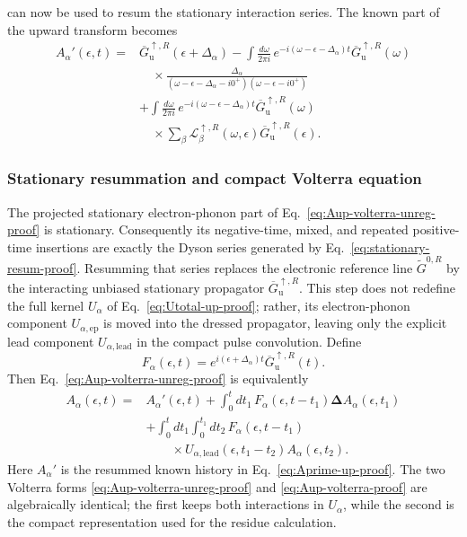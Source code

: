\documentclass[
 reprint,
 superscriptaddress,
 amsmath,amssymb,
 aps,prb,
 longbibliography,
 floatfix
]{revtex4-2}
\newcommand{\ep}{\mathrm{ep}}
\newcommand{\lead}{\mathrm{lead}}
\begin{document}
can now be used to resum the stationary interaction series. The known part of the upward transform becomes
\begin{equation}
\begin{aligned}
A_\alpha'(\epsilon,t)
={}&
\overline G_{\mathrm u}^{\uparrow,R}(\epsilon+\Delta_\alpha)
-
\int\frac{d\omega}{2\pi i}\,
e^{-i(\omega-\epsilon-\Delta_\alpha)t}
\overline G_{\mathrm u}^{\uparrow,R}(\omega)
\\
&\quad\times
\frac{\Delta_\alpha}
{
(\omega-\epsilon-\Delta_\alpha-i0^+)
(\omega-\epsilon-i0^+)
}
\\
&+
\int\frac{d\omega}{2\pi i}\,
e^{-i(\omega-\epsilon-\Delta_\alpha)t}
\overline G_{\mathrm u}^{\uparrow,R}(\omega)
\\
&\quad\times
\sum_\beta
\mathcal L_\beta^{\uparrow,R}(\omega,\epsilon)
\overline G_{\mathrm u}^{\uparrow,R}(\epsilon).
\end{aligned}
\label{eq:Aprime-up-proof}
\end{equation}

\subsubsection{Stationary resummation and compact Volterra equation}

The projected stationary electron-phonon part of Eq.~\eqref{eq:Aup-volterra-unreg-proof} is stationary. Consequently its negative-time, mixed, and repeated positive-time insertions are exactly the Dyson series generated by Eq.~\eqref{eq:stationary-resum-proof}. Resumming that series replaces the electronic reference line $\widetilde G^{0,R}$ by the interacting unbiased stationary propagator $\overline G_{\mathrm u}^{\uparrow,R}$. This step does not redefine the full kernel $U_\alpha$ of Eq.~\eqref{eq:Utotal-up-proof}; rather, its electron-phonon component $U_{\alpha,\ep}$ is moved into the dressed propagator, leaving only the explicit lead component $U_{\alpha,\lead}$ in the compact pulse convolution. Define
\begin{equation*}
F_\alpha(\epsilon,t)
=
e^{i(\epsilon+\Delta_\alpha)t}
\overline G_{\mathrm u}^{\uparrow,R}(t).
\end{equation*}
Then Eq.~\eqref{eq:Aup-volterra-unreg-proof} is equivalently
\begin{equation}
\begin{aligned}
A_\alpha(\epsilon,t)
={}&
A_\alpha'(\epsilon,t)
+
\int_0^t dt_1\,
F_\alpha(\epsilon,t-t_1)
\bm\Delta
A_\alpha(\epsilon,t_1)
\\
&+
\int_0^t dt_1
\int_0^{t_1}dt_2\,
F_\alpha(\epsilon,t-t_1)
\\
&\qquad\times
U_{\alpha,\lead}(\epsilon,t_1-t_2)
A_\alpha(\epsilon,t_2).
\end{aligned}
\label{eq:Aup-volterra-proof}
\end{equation}
Here $A_\alpha'$ is the resummed known history in Eq.~\eqref{eq:Aprime-up-proof}. The two Volterra forms \eqref{eq:Aup-volterra-unreg-proof} and \eqref{eq:Aup-volterra-proof} are algebraically identical; the first keeps both interactions in $U_\alpha$, while the second is the compact representation used for the residue calculation.
\end{document}
